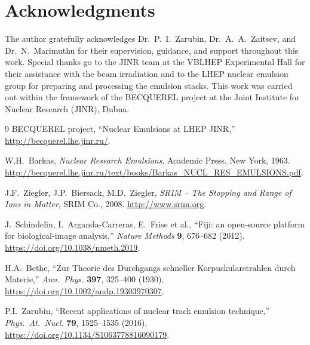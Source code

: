 \documentclass[12pt,a4paper]{article}
\begin{document}
\newpage
\section*{Acknowledgments}

The author gratefully acknowledges Dr.\ P.\ I.\ Zarubin,
Dr.\ A.\ A.\ Zaitsev, and Dr.\ N.\ Marimuthu for their supervision,
guidance, and support
throughout this work. Special thanks go to the JINR team at the
VBLHEP Experimental Hall for their assistance with the beam
irradiation and to the LHEP nuclear emulsion group for preparing and
processing the emulsion stacks. This work was carried out within the
framework of the BECQUEREL project at the Joint Institute for Nuclear
Research (JINR), Dubna.

\begin{thebibliography}{9}
BECQUEREL project,
``Nuclear Emulsions at LHEP JINR,''
\url{http://becquerel.lhe.jinr.ru/}.

W.H.\ Barkas,
\textit{Nuclear Research Emulsions},
Academic Press, New York, 1963.
\url{http://becquerel.lhe.jinr.ru/text/books/Barkas_NUCL_RES_EMULSIONS.pdf}.

J.F.\ Ziegler, J.P.\ Biersack, M.D.\ Ziegler,
\textit{SRIM -- The Stopping and Range of Ions in Matter},
SRIM Co., 2008.
\url{http://www.srim.org}.

J.\ Schindelin, I.\ Arganda-Carreras, E.\ Frise et al.,
``Fiji: an open-source platform for biological-image analysis,''
\textit{Nature Methods} \textbf{9}, 676--682 (2012).
\url{https://doi.org/10.1038/nmeth.2019}.

H.A.\ Bethe,
``Zur Theorie des Durchgangs schneller Korpuskularstrahlen durch
Materie,''
\textit{Ann.\ Phys.} \textbf{397}, 325--400 (1930).
\url{https://doi.org/10.1002/andp.19303970307}.

P.I.\ Zarubin,
``Recent applications of nuclear track emulsion technique,''
\textit{Phys.\ At.\ Nucl.} \textbf{79}, 1525--1535 (2016).
\url{https://doi.org/10.1134/S1063778816090179}.

\end{thebibliography}
\end{document}
